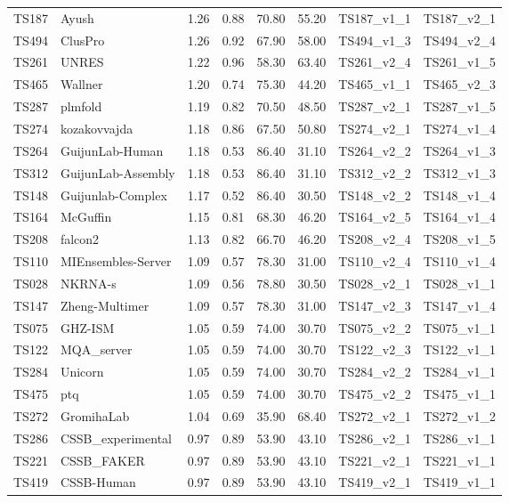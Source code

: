 \begin{table}[ht]
{\begin{tabular}{llllllll}
TS187 & Ayush & 1.26 & 0.88 & 70.80 & 55.20 & TS187\_v1\_1 & TS187\_v2\_1 \\ 
TS494 & ClusPro & 1.26 & 0.92 & 67.90 & 58.00 & TS494\_v1\_3 & TS494\_v2\_4 \\ 
TS261 & UNRES & 1.22 & 0.96 & 58.30 & 63.40 & TS261\_v2\_4 & TS261\_v1\_5 \\ 
TS465 & Wallner & 1.20 & 0.74 & 75.30 & 44.20 & TS465\_v1\_1 & TS465\_v2\_3 \\ 
TS287 & plmfold & 1.19 & 0.82 & 70.50 & 48.50 & TS287\_v2\_1 & TS287\_v1\_5 \\ 
TS274 & kozakovvajda & 1.18 & 0.86 & 67.50 & 50.80 & TS274\_v2\_1 & TS274\_v1\_4 \\ 
TS264 & GuijunLab-Human & 1.18 & 0.53 & 86.40 & 31.10 & TS264\_v2\_2 & TS264\_v1\_3 \\ 
TS312 & GuijunLab-Assembly & 1.18 & 0.53 & 86.40 & 31.10 & TS312\_v2\_2 & TS312\_v1\_3 \\ 
TS148 & Guijunlab-Complex & 1.17 & 0.52 & 86.40 & 30.50 & TS148\_v2\_2 & TS148\_v1\_4 \\ 
TS164 & McGuffin & 1.15 & 0.81 & 68.30 & 46.20 & TS164\_v2\_5 & TS164\_v1\_4 \\ 
TS208 & falcon2 & 1.13 & 0.82 & 66.70 & 46.20 & TS208\_v2\_4 & TS208\_v1\_5 \\ 
TS110 & MIEnsembles-Server & 1.09 & 0.57 & 78.30 & 31.00 & TS110\_v2\_4 & TS110\_v1\_4 \\ 
TS028 & NKRNA-s & 1.09 & 0.56 & 78.80 & 30.50 & TS028\_v2\_1 & TS028\_v1\_1 \\ 
TS147 & Zheng-Multimer & 1.09 & 0.57 & 78.30 & 31.00 & TS147\_v2\_3 & TS147\_v1\_4 \\ 
TS075 & GHZ-ISM & 1.05 & 0.59 & 74.00 & 30.70 & TS075\_v2\_2 & TS075\_v1\_1 \\ 
TS122 & MQA\_server & 1.05 & 0.59 & 74.00 & 30.70 & TS122\_v2\_3 & TS122\_v1\_1 \\ 
TS284 & Unicorn & 1.05 & 0.59 & 74.00 & 30.70 & TS284\_v2\_2 & TS284\_v1\_1 \\ 
TS475 & ptq & 1.05 & 0.59 & 74.00 & 30.70 & TS475\_v2\_2 & TS475\_v1\_1 \\ 
TS272 & GromihaLab & 1.04 & 0.69 & 35.90 & 68.40 & TS272\_v2\_1 & TS272\_v1\_2 \\ 
TS286 & CSSB\_experimental & 0.97 & 0.89 & 53.90 & 43.10 & TS286\_v2\_1 & TS286\_v1\_1 \\ 
TS221 & CSSB\_FAKER & 0.97 & 0.89 & 53.90 & 43.10 & TS221\_v2\_1 & TS221\_v1\_1 \\ 
TS419 & CSSB-Human & 0.97 & 0.89 & 53.90 & 43.10 & TS419\_v2\_1 & TS419\_v1\_1 \\ 

\end{tabular}}
\end{table}
